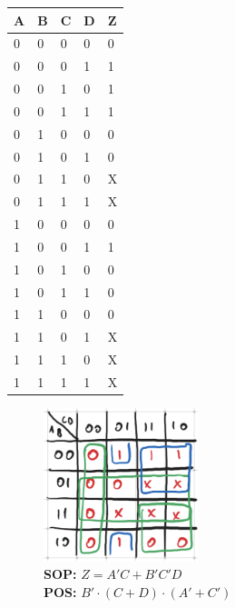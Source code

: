 \documentclass{article}
\begin{document}
\begin{table}[!h]
\centering
\begin{tabular}{|l|l|l|l|l|}
\hline
\textbf{A} & \textbf{B} & \textbf{C} & \textbf{D} & \textbf{Z} \\ \hline
0          & 0          & 0          & 0          & 0          \\ \hline
0          & 0          & 0          & 1          & 1          \\ \hline
0          & 0          & 1          & 0          & 1          \\ \hline
0          & 0          & 1          & 1          & 1          \\ \hline
0          & 1          & 0          & 0          & 0          \\ \hline
0          & 1          & 0          & 1          & 0          \\ \hline
0          & 1          & 1          & 0          & X          \\ \hline
0          & 1          & 1          & 1          & X          \\ \hline
1          & 0          & 0          & 0          & 0          \\ \hline
1          & 0          & 0          & 1          & 1          \\ \hline
1          & 0          & 1          & 0          & 0          \\ \hline
1          & 0          & 1          & 1          & 0          \\ \hline
1          & 1          & 0          & 0          & 0          \\ \hline
1          & 1          & 0          & 1          & X          \\ \hline
1          & 1          & 1          & 0          & X          \\ \hline
1          & 1          & 1          & 1          & X          \\ \hline
\end{tabular}
\end{table}

\begin{figure}[!h]
\centering
\includegraphics[width=0.4\textwidth]{figures/kmap1b_solution.png} \\
\textbf{SOP: } $Z=A'C+B'C'D$ \\
\textbf{POS: } $B' \cdot (C+D) \cdot (A'+C')$ \\
\end{figure}
\newpage
\end{document}
